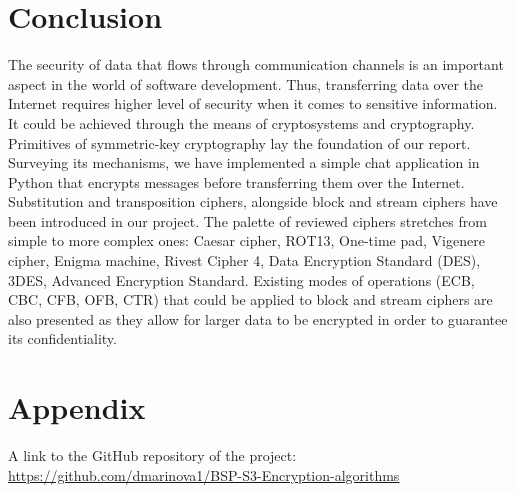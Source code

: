 \section{Conclusion}

The security of data that flows through communication channels is an important aspect in the world of software development. Thus, transferring data over the Internet requires higher level of security when it comes to sensitive information. It could be achieved through the means of cryptosystems and cryptography. Primitives of symmetric-key cryptography lay the foundation of our report. Surveying its mechanisms, we have implemented a simple chat application in Python that encrypts messages before transferring them over the Internet. Substitution and transposition ciphers, alongside block and stream ciphers have been introduced in our project. The palette of reviewed ciphers stretches from simple to more complex ones: Caesar cipher, ROT13, One-time pad, Vigenere cipher, Enigma machine, Rivest Cipher 4, Data Encryption Standard (DES), 3DES, Advanced Encryption Standard. Existing modes of operations (ECB, CBC, CFB, OFB, CTR)  that could be applied to block and stream ciphers are also presented as they allow for larger data to be encrypted in order to guarantee its confidentiality. 

\newpage 
\section{Appendix}


A link to the GitHub repository of the project: \url{https://github.com/dmarinova1/BSP-S3-Encryption-algorithms}
